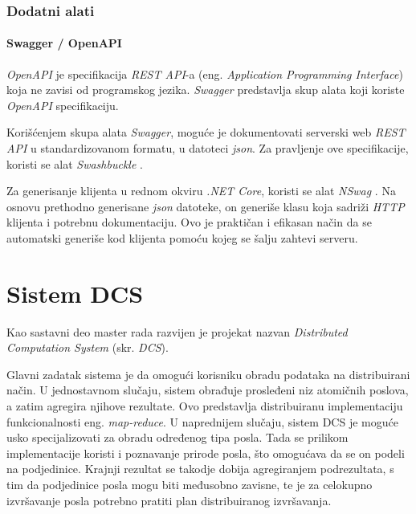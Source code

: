 \documentclass[12pt,oneside]{memoir}
\begin{document}
\subsection{Dodatni alati}

\subsubsection{Swagger / OpenAPI}

\emph{OpenAPI} \cite{OpenAPI} je specifikacija \emph{REST API}-a (eng. \emph{Application Programming Interface}) koja ne zavisi od programskog jezika. \emph{Swagger} \cite{Swagger} predstavlja skup alata koji koriste \emph{OpenAPI} specifikaciju.

Korišćenjem skupa alata \emph{Swagger}, moguće je dokumentovati serverski web \emph{REST API} u standardizovanom formatu, u datoteci \emph{json}. Za pravljenje ove specifikacije, koristi se alat \emph{Swashbuckle} \cite{Swashbuckle}.

Za generisanje klijenta u rednom okviru \emph{.NET Core}, koristi se alat \emph{NSwag} \cite{NSwag}. Na osnovu prethodno generisane \emph{json} datoteke, on generiše klasu koja sadriži \emph{HTTP} klijenta i potrebnu dokumentaciju. Ovo je praktičan i efikasan način da se automatski generiše kod klijenta pomoću kojeg se šalju zahtevi serveru.



\chapter{Sistem DCS}
\label{chp:sistemdcs}

Kao sastavni deo master rada razvijen je projekat nazvan \emph{Distributed Computation System} (skr. \emph{DCS}).

Glavni zadatak sistema je da omogući korisniku obradu podataka na distribuirani način.
U jednostavnom slučaju, sistem obrađuje prosleđeni niz atomičnih poslova, a zatim agregira njihove rezultate. Ovo predstavlja distribuiranu implementaciju funkcionalnosti eng. \emph{map-reduce}.
U naprednijem slučaju, sistem DCS je moguće usko specijalizovati za obradu određenog tipa posla. Tada se prilikom implementacije koristi i poznavanje prirode posla, što omogućava da se on podeli na podjedinice. Krajnji rezultat se takodje dobija agregiranjem podrezultata, s tim da podjedinice posla mogu biti međusobno zavisne, te je za celokupno izvršavanje posla potrebno pratiti plan distribuiranog izvršavanja.
\end{document}
